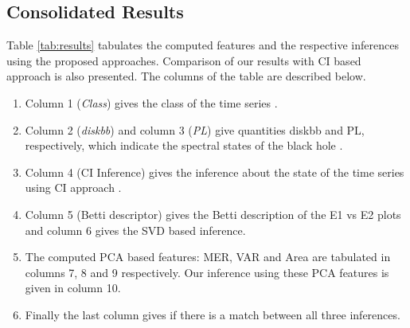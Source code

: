 \documentclass[10pt,conference]{IEEEtran}
\begin{document}
\subsection{Consolidated Results}

Table \ref{tab:results}  tabulates the computed features and the respective inferences using the proposed approaches. Comparison of our results with CI based approach \cite{Adegoke2018} is also presented. The columns of the table are described below.

\begin{enumerate}
\item Column 1 (\textit{Class}) gives the class of the time series \cite{Adegoke2018}.
\item Column 2 (\textit{diskbb}) and column 3 (\textit{PL}) give quantities diskbb and  PL, respectively, which indicate the spectral states of the black hole \cite{Adegoke2018}.
\item Column 4 (CI Inference) gives the inference about the state of the time series using CI approach \cite{Adegoke2018}.
\item Column 5 (Betti descriptor) gives the Betti description of the E1 vs E2 plots and column 6 gives the SVD based inference.
\item The computed PCA based features: MER, VAR and Area  are tabulated in columns 7, 8 and 9 respectively. Our inference using these PCA features is given in column 10.
\item Finally the last column gives if there is a match between all three inferences.
\end{enumerate}
\end{document}
